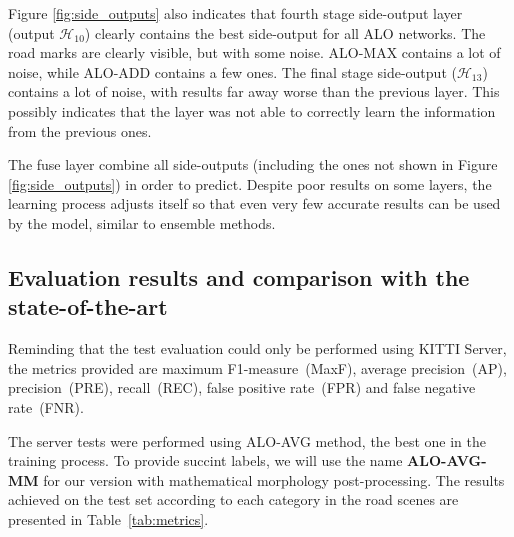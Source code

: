 Figure \ref{fig:side_outputs} also indicates that fourth stage side-output layer (output $\mathcal{H}_{10}$) clearly contains the best side-output for all ALO networks. The road marks are clearly visible, but with some noise. ALO-MAX contains a lot of noise, while ALO-ADD contains a few ones. The final stage side-output ($\mathcal{H}_{13}$) contains a lot of noise, with results far away worse than the previous layer. This possibly indicates that the layer was not able to correctly learn the information from the previous ones.

The fuse layer combine all side-outputs (including the ones not shown in Figure \ref{fig:side_outputs}) in order to predict. Despite poor results on some layers, the learning process adjusts itself so that even very few accurate results can be used by the model, similar to ensemble methods.


\subsection{Evaluation results and comparison with the state-of-the-art}

Reminding that the test evaluation could only be performed using KITTI Server, the metrics provided are maximum F1-measure~(MaxF), average precision~(AP), precision~(PRE), recall~(REC), false positive rate~(FPR) and false negative rate~(FNR). 

The server tests were performed using ALO-AVG method, the best one in the training process. To provide succint labels, we will use the name \textbf{ALO-AVG-MM} for our version with mathematical morphology post-processing. The results achieved  on the test set according to each category in the road scenes are presented in Table~\ref{tab:metrics}. 

